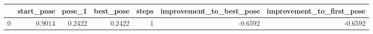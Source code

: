 \begin{tabular}{lrrrrrr}
\toprule
{} &  start\_pose &  pose\_1 &  best\_pose &  steps &  improvement\_to\_best\_pose &  improvement\_to\_first\_pose \\
\midrule
0 &      0.9014 &  0.2422 &     0.2422 &      1 &                   -0.6592 &                    -0.6592 \\
\bottomrule
\end{tabular}
